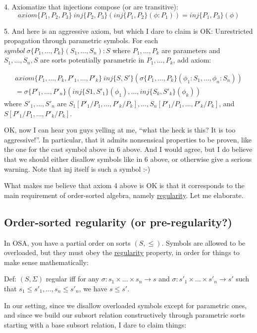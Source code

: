 \documentclass[UTF8,11pt]{article}
\theoremstyle{plain}
\theoremstyle{definition}
\theoremstyle{remark}
\begin{document}
4. Axiomatize that injections compose (or are transitive):
\[axiom\{P_1,P_2,P_3\} \ inj\{P_2,P_3\}(inj\{P_1,P_2\}(\phi:P_1))=inj\{P_1,P_3\}(\phi)\]

5. And here is an aggressive axiom, but which I dare to claim is OK: Unrestricted propagation through parametric symbols. For each $symbol\ \sigma\{P_1,\dots,P_k\}(S_1,\dots,S_n):S$ where $P_1, \dots,P_k$ are parameters and $S_1,\dots,S_n,S$ are sorts potentially parametric in $P_1, \dots,P_k$, add axiom:

\begin{align*}
axiom\{P_1, \dots,P_k,P'_1,\dots,P'_k\} \ inj\{S,S'\}(\sigma\{P_1,\dots,P_k\}(\phi_1:S_1,\dots,\phi_n:S_n))\\=\sigma\{P'_1,\dots,P'_n\}(inj\{S1,S'_1\}(\phi_1),\dots,inj\{S_k,S'_k\}(\phi_k))
\end{align*}
where $S'_1,\dots,S'_n$ are $S_1[P'_1/P_1,\dots,P'_k/P_k],\dots,S_n[P'_1/P_1,\dots,P'_k/P_k]$, and $S[P'_1/P_1,\dots,P'_k/P_k]$.

OK, now I can hear you guys yelling at me, ``what the heck is this? It is too aggressive!''. In particular, that it admits nonsensical properties to be proven, like the one for the cast symbol above in 6 above. And I would agree, but I do believe that we should either disallow symbols like in 6 above, or otherwise give a serious warning. Note that inj itself is such a symbol :-)

What makes me believe that axiom 4 above is OK is that it corresponds to the main requirement of order-sorted algebra, namely \underline{regularity}. Let me elaborate.


\subsection{Order-sorted regularity (or pre-regularity?)}

In OSA, you have a partial order on sorts $(S,\le)$. Symbols are allowed to be overloaded, but they must obey the \underline{regularity} property, in order for things to make sense mathematically:

Def: $(S,\Sigma)$ regular iff for any $\sigma:s_1\times \dots \times s_n\rightarrow s$ and $\sigma:s'_1\times \dots \times s'_n\rightarrow s'$ such that $s_1 \le s'_1, \dots, s_n \le s'_n$, we have $s \le s'$.

In our setting, since we disallow overloaded symbols except for parametric ones, and since we build our subsort relation constructively through parametric sorts starting with a base subsort relation, I dare to claim things:
\end{document}

